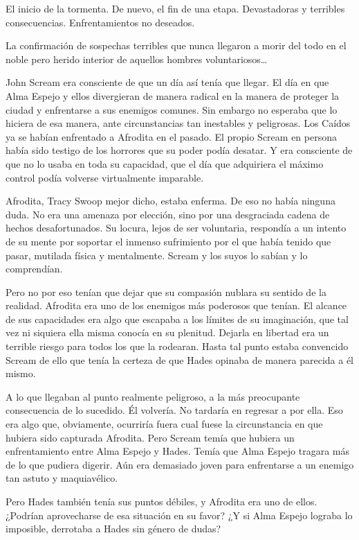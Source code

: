 El inicio de la tormenta. De nuevo, el fin de una etapa. Devastadoras y terribles consecuencias. Enfrentamientos no deseados.

La confirmación de sospechas terribles que nunca llegaron a morir del todo en el noble pero herido interior de aquellos hombres voluntariosos\dots

\fancyparbreak
John Scream era consciente de que un día así tenía que llegar. El día en que Alma Espejo y ellos divergieran de manera radical en la manera de proteger la ciudad y enfrentarse a sus enemigos comunes. Sin embargo no esperaba que lo hiciera de esa manera, ante circunstancias tan inestables y peligrosas. Los Caídos ya se habían enfrentado a Afrodita en el pasado. El propio Scream en persona había sido testigo de los horrores que su poder podía desatar. Y era consciente de que no lo usaba en toda su capacidad, que el día que adquiriera el máximo control podía volverse virtualmente imparable.

Afrodita, Tracy Swoop mejor dicho, estaba enferma. De eso no había ninguna duda. No era una amenaza por elección, sino por una desgraciada cadena de hechos desafortunados. Su locura, lejos de ser voluntaria, respondía a un intento de su mente por soportar el inmenso sufrimiento por el que había tenido que pasar, mutilada física y mentalmente. Scream y los suyos lo sabían y lo comprendían.

Pero no por eso tenían que dejar que su compasión nublara su sentido de la realidad. Afrodita era uno de los enemigos más poderosos que tenían. El alcance de sus capacidades era algo que escapaba a los límites de su imaginación, que tal vez ni siquiera ella misma conocía en su plenitud. Dejarla en libertad era un terrible riesgo para todos los que la rodearan. Hasta tal punto estaba convencido Scream de ello que tenía la certeza de que Hades opinaba de manera parecida a él mismo.

A lo que llegaban al punto realmente peligroso, a la más preocupante consecuencia de lo sucedido. Él volvería. No tardaría en regresar a por ella. Eso era algo que, obviamente, ocurriría fuera cual fuese la circunstancia en que hubiera sido capturada Afrodita. Pero Scream temía que hubiera un enfrentamiento entre Alma Espejo y Hades. Temía que Alma Espejo tragara más de lo que pudiera digerir. Aún era demasiado joven para enfrentarse a un enemigo tan astuto y maquiavélico.

Pero Hades también tenía sus puntos débiles, y Afrodita era uno de ellos. ¿Podrían aprovecharse de esa situación en su favor? ¿Y si Alma Espejo lograba lo imposible, derrotaba a Hades sin género de dudas?

